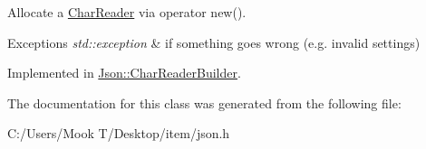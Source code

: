 Allocate a \hyperlink{class_json_1_1_char_reader}{Char\+Reader} via operator new(). 


\begin{DoxyExceptions}{Exceptions}
{\em std\+::exception} & if something goes wrong (e.\+g. invalid settings) \\
\hline
\end{DoxyExceptions}


Implemented in \hyperlink{class_json_1_1_char_reader_builder_a3e3c9f4aeb07023ef0c5f6255003078a}{Json\+::\+Char\+Reader\+Builder}.



The documentation for this class was generated from the following file\+:\begin{DoxyCompactItemize}
\item 
C\+:/\+Users/\+Mook T/\+Desktop/item/json.\+h\end{DoxyCompactItemize}
